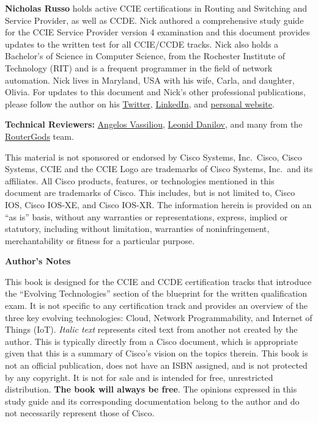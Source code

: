 \noindent
\textbf{Nicholas Russo} holds active CCIE certifications in Routing and
Switching and Service Provider, as well as CCDE\@. Nick authored a comprehensive
study guide for the CCIE Service Provider version 4 examination and this
document provides updates to the written test for all CCIE/CCDE tracks. Nick
also holds a Bachelor’s of Science in Computer Science, from the Rochester
Institute of Technology (RIT) and is a frequent programmer in the field of
network automation. Nick lives in Maryland, USA with his wife, Carla, and
daughter, Olivia. For updates to this document and Nick’s other professional
publications, please follow the author on his
\href{https://twitter.com/nickrusso42518}{Twitter},
\href{https://www.linkedin.com/in/njrusmc}{LinkedIn}, and
\href{http://njrusmc.net}{personal website}.


\textbf{Technical Reviewers:}
\href{https://twitter.com/ipmess}{Angelos Vassiliou},
\href{https://twitter.com/iosxrqna}{Leonid Danilov}, and many from the
\href{https://www.meetup.com/routergods}{RouterGods} team.

This material is not sponsored or endorsed by Cisco Systems, Inc.\ Cisco, Cisco
Systems, CCIE and the CCIE Logo are trademarks of Cisco Systems, Inc.\ and its
affiliates. All Cisco products, features, or technologies mentioned in this
document are trademarks of Cisco. This includes, but is not limited to, Cisco
IOS, Cisco IOS-XE, and Cisco IOS-XR\@. The information herein is provided on an
``as is'' basis, without any warranties or representations, express, implied or
statutory, including without limitation, warranties of noninfringement,
merchantability or fitness for a particular purpose.

\textbf{Author’s Notes}

This book is designed for the CCIE and CCDE certification tracks that
introduce the ``Evolving Technologies'' section of the blueprint for the written
qualification exam. It is not specific to any certification track and provides
an overview of the three key evolving technologies: Cloud, Network
Programmability, and Internet of Things (IoT). \textit{Italic text} represents
cited text from another not created by the author. This is typically directly
from a Cisco document, which is appropriate given that this is a summary of
Cisco’s vision on the topics therein. This book is not an official
publication, does not have an ISBN assigned, and is not protected by any
copyright. It is not for sale and is intended for free, unrestricted
distribution. \textbf{The book will always be free}. The opinions expressed in
this study guide and its corresponding documentation belong to the author and
do not necessarily represent those of Cisco.

